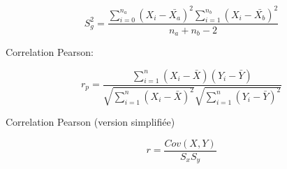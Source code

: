 \documentclass{article}
\begin{document}
\begin{equation}
    S_g^2 = \frac{\sum_{i=0}^{n_a} (X_i - \bar{X_a})^2 \sum_{i=1}^{n_b} (X_i - \bar{X_b})^2 }{n_a + n_b - 2}
\end{equation}

\bigskip

Correlation Pearson:

\begin{equation}
    r_p = \frac{\sum_{i=1}^{n} (X_i - \bar{X}) (Y_i - \bar{Y})}{\sqrt{\sum_{i=1}^n (X_i - \bar{X})^2}\sqrt{\sum_{i=1}^n (Y_i - \bar{Y})^2}}
\end{equation}


Correlation Pearson (version simplifiée)

\begin{equation}
    r = \frac{Cov(X,Y)}{S_x S_y}
\end{equation}
\end{document}
